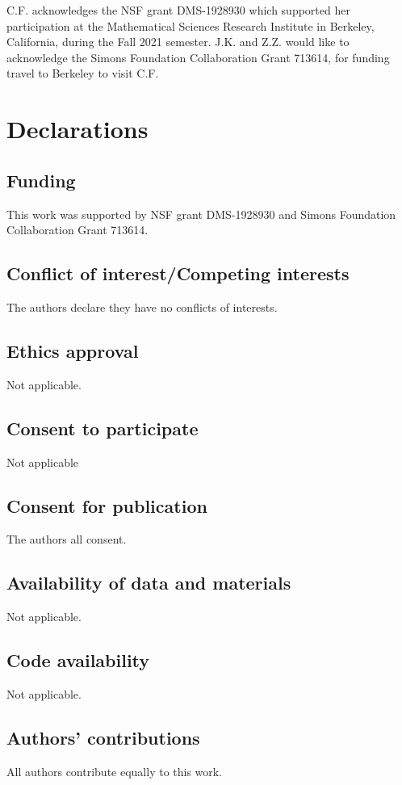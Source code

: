 \documentclass{ximera}
\begin{document}
 C.F. acknowledges the NSF grant DMS-1928930 which supported her participation at the Mathematical Sciences Research Institute in Berkeley, California, during the Fall 2021 semester. J.K. and Z.Z. would like to acknowledge the Simons Foundation Collaboration Grant 713614, for funding travel to Berkeley to visit C.F.

\section*{Declarations}

\subsection*{Funding}
This work was supported by NSF grant DMS-1928930 and Simons Foundation Collaboration Grant 713614. 
\subsection*{Conflict of interest/Competing interests} 
The authors declare they have no conflicts of interests.

\subsection*{ Ethics approval }
Not applicable.
\subsection*{ Consent to participate} Not applicable
\subsection*{Consent for publication}
The authors all consent.
\subsection*{ Availability of data and materials}
Not applicable.
\subsection*{ Code availability }
Not applicable.
\subsection*{ Authors' contributions}
All authors contribute equally to this work.
\end{document}
